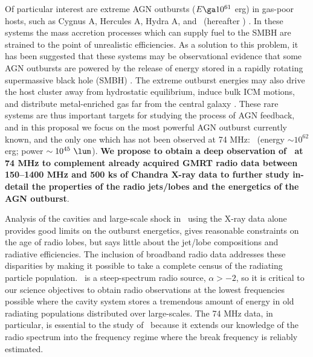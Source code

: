 \documentclass[11pt]{article}
\begin{document}
Of particular interest are extreme AGN outbursts ($E \ga 10^{61}$ erg)
in gas-poor hosts, such as Cygnus A, Hercules A, Hydra A, and
\mso\ (hereafter \ms) \cite{2006ApJ...644L...9W, herca, hydraa,
  ms0735}. In these systems the mass accretion processes which can
supply fuel to the SMBH are strained to the point of unrealistic
efficiencies. As a solution to this problem, it has been suggested
that these systems may be observational evidence that some AGN
outbursts are powered by the release of energy stored in a rapidly
rotating supermassive black hole (SMBH) \cite{msspin, minaspin}. The
extreme outburst energies may also drive the host cluster away from
hydrostatic equilibrium, induce bulk ICM motions, and distribute
metal-enriched gas far from the central galaxy
\cite{2007ApJ...660.1118G, hydrametal, 2009A&A...495..721S}. These
rare systems are thus important targets for studying the process of
AGN feedback, and in this proposal we focus on the most powerful AGN
outburst currently known, and the only one which has not been observed
at 74 MHz: \ms\ (energy $\sim 10^{62}$ erg; power $\sim 10^{45}
~\lum$). {\bf We propose to obtain a deep observation of \ms\ at 74
  MHz to complement already acquired GMRT radio data between 150--1400
  MHz and 500 ks of Chandra X-ray data to further study in-detail the
  properties of the radio jets/lobes and the energetics of the AGN
  outburst}.

Analysis of the cavities and large-scale shock in \ms\ using the X-ray
data alone provides good limits on the outburst energetics, gives
reasonable constraints on the age of radio lobes, but says little
about the jet/lobe compositions and radiative efficiencies. The
inclusion of broadband radio data addresses these disparities by
making it possible to take a complete census of the radiating particle
population. \ms\ is a steep-spectrum radio source, $\alpha > -2$, so
it is critical to our science objectives to obtain radio observations
at the lowest frequencies possible where the cavity system stores a
tremendous amount of energy in old radiating populations distributed
over large-scales. The 74 MHz data, in particular, is essential to the
study of \ms\ because it extends our knowledge of the radio spectrum
into the frequency regime where the break frequency is reliably
estimated.
\end{document}
